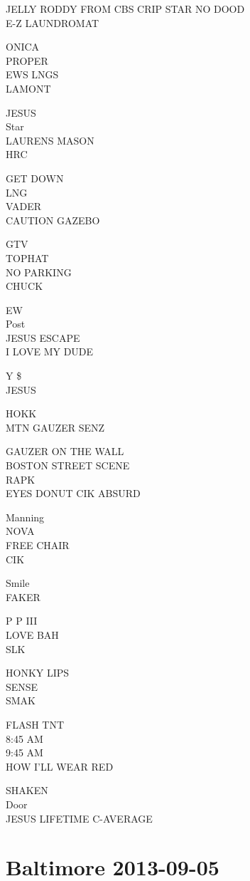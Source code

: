 \documentclass[10pt,letterpaper]{article}
\begin{document}
JELLY RODDY FROM CBS CRIP STAR NO DOOD\\
E{-}Z LAUNDROMAT

ONICA\\
PROPER\\
EWS LNGS\\
LAMONT

JESUS\\
Star\\
LAURENS MASON\\
HRC

GET DOWN\\
LNG\\
VADER\\
CAUTION GAZEBO

GTV\\
TOPHAT\\
NO PARKING\\
CHUCK

EW\\
Post\\
JESUS ESCAPE\\
I LOVE MY DUDE

Y \$\\
JESUS

HOKK\\
MTN GAUZER SENZ

GAUZER ON THE WALL\\
BOSTON STREET SCENE\\
RAPK\\
EYES DONUT CIK ABSURD

Manning\\
NOVA\\
FREE CHAIR\\
CIK

Smile\\
FAKER

P P III\\
LOVE BAH\\
SLK

HONKY LIPS\\
SENSE\\
SMAK

FLASH TNT\\
8:45 AM\\
9:45 AM\\
HOW I'LL WEAR RED

SHAKEN\\
Door\\
JESUS LIFETIME C{-}AVERAGE


\section*{Baltimore 2013-09-05}
\end{document}
